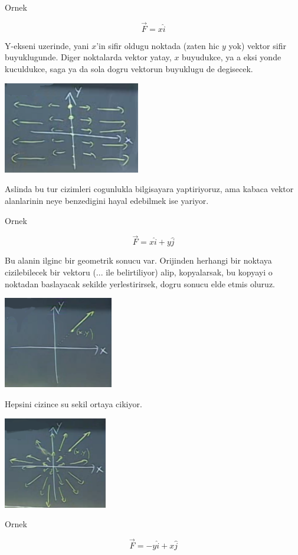 \documentclass[12pt,fleqn]{article}
\begin{document}
Ornek

\[ \vec{F} = x\hat{i} \]

Y-ekseni uzerinde, yani $x$'in sifir oldugu noktada (zaten hic $y$ yok)
vektor sifir buyuklugunde. Diger noktalarda vektor yatay, $x$ buyudukce, ya
a eksi yonde kuculdukce, saga ya da sola dogru vektorun buyuklugu de
degisecek.

\includegraphics[height=4cm]{19_2.png}

Aslinda bu tur cizimleri cogunlukla bilgisayara yaptiriyoruz, ama kabaca
vektor alanlarinin neye benzedigini hayal edebilmek ise yariyor. 

Ornek

\[ \vec{F} = x\hat{i} + y\hat{j} \]

Bu alanin ilginc bir geometrik sonucu var.  Orijinden herhangi bir noktaya
cizilebilecek bir vektoru (... ile belirtiliyor) alip, kopyalarsak, bu
kopyayi o noktadan baslayacak sekilde yerlestirirsek, dogru sonucu elde
etmis oluruz.

\includegraphics[height=4cm]{19_3.png}

Hepsini cizince su sekil ortaya cikiyor. 

\includegraphics[height=4cm]{19_4.png}

Ornek

\[ \vec{F} = -y\hat{i} + x\hat{j} \]
\end{document}
